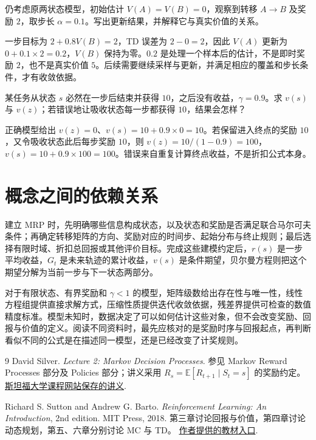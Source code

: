 \documentclass[UTF8]{ctexart}
\begin{document}
\begin{example}[一次 TD 更新是否等于求出了价值]
仍考虑原两状态模型，初始估计 $V(A)=V(B)=0$，观察到转移 $A\to B$ 及奖励 $2$，取步长 $\alpha=0.1$。写出更新结果，并解释它与真实价值的关系。
\end{example}
\begin{solve}
一步目标为 $2+0.8V(B)=2$，TD 误差为 $2-0=2$，因此 $V(A)$ 更新为 $0+0.1\times2=0.2$，$V(B)$ 保持为零。$0.2$ 是处理一个样本后的估计，不是即时奖励 $2$，也不是真实价值 $5$。后续需要继续采样与更新，并满足相应的覆盖和步长条件，才有收敛依据。
\end{solve}

\begin{example}[终止奖励与吸收状态奖励的区别]
某任务从状态 $s$ 必然在一步后结束并获得 $10$，之后没有收益，$\gamma=0.9$。求 $v(s)$ 与 $v(z)$；若错误地让吸收状态每一步都获得 $10$，结果会怎样？
\end{example}
\begin{solve}
正确模型给出 $v(z)=0$、$v(s)=10+0.9\times0=10$。若保留进入终点的奖励 $10$，又令吸收状态此后每步奖励 $10$，则 $v(z)=10/(1-0.9)=100$，$v(s)=10+0.9\times100=100$。错误来自重复计算终点收益，不是折扣公式本身。
\end{solve}

\section{概念之间的依赖关系}
\label{sec:mrp-connections}

建立 MRP 时，先明确哪些信息构成状态，以及状态和奖励是否满足联合马尔可夫条件；再确定转移矩阵的方向、奖励对应的时间步、起始分布与终止规则；最后选择有限时域、折扣总回报或其他评价目标。完成这些建模约定后，$r(s)$ 是一步平均收益，$G_t$ 是未来轨迹的累计收益，$v(s)$ 是条件期望，贝尔曼方程则把这个期望分解为当前一步与下一状态两部分。

对于有限状态、有界奖励和 $\gamma<1$ 的模型，矩阵级数给出存在性与唯一性，线性方程组提供直接求解方式，压缩性质提供迭代收敛依据，残差界提供可检查的数值精度标准。模型未知时，数据决定了可以如何估计这些对象，但不会改变奖励、回报与价值的定义。阅读不同资料时，最先应核对的是奖励时序与回报起点，再判断看似不同的公式是在描述同一模型，还是已经改变了计奖规则。

\begin{thebibliography}{9}
  David Silver.
  \emph{Lecture 2: Markov Decision Processes}.
  参见 Markov Reward Processes 部分及 Policies 部分；讲义采用
  $R_s=\mathbb E[R_{t+1}\mid S_t=s]$ 的奖励约定。
  \href{https://web.stanford.edu/class/cme241/lecture_slides/david_silver_slides/MDP.pdf}{斯坦福大学课程网站保存的讲义}.

  Richard S. Sutton and Andrew G. Barto.
  \emph{Reinforcement Learning: An Introduction}, 2nd edition.
  MIT Press, 2018.
  第三章讨论回报与价值，第四章讨论动态规划，第五、六章分别讨论 MC 与 TD。
  \href{https://incompleteideas.net/book/the-book-2nd.html}{作者提供的教材入口}.
\end{thebibliography}
\end{document}

